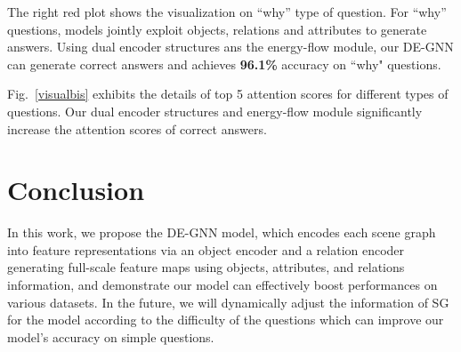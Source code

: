 \documentclass[letterpaper]{article} %
\begin{document}
The right red plot shows the visualization on ``why'' type of question. 
For ``why'' questions, models jointly exploit objects, relations and attributes to generate answers. 
Using dual encoder structures ans the energy-flow module, our DE-GNN can generate correct answers and achieves \textbf{96.1\%} accuracy on ``why" questions.

Fig.~\ref{visualbis} exhibits the details of top 5 attention scores for different types of questions. 
Our dual encoder structures and energy-flow module significantly increase the attention scores of correct answers.


\section{Conclusion}
In this work, 
we propose the DE-GNN model, which encodes each scene graph into feature representations via an object encoder and a relation encoder generating full-scale feature maps using objects, attributes, and relations information, and demonstrate our model can effectively boost performances on various datasets. 
In the future, we will dynamically adjust the information of SG for the model according to the difficulty of the questions which can improve our model's accuracy on simple questions.


\newpage


\clearpage

\end{document}
